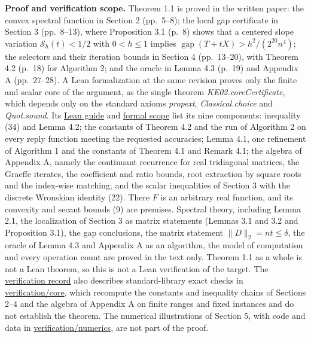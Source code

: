 \documentclass[11pt,a4paper]{article}
\begin{document}
\textbf{Proof and verification scope.} Theorem 1.1 is proved in the
written paper: the convex spectral function in Section 2 (pp.~5--8); the
local gap certificate in Section 3 (pp.~8--13), where Proposition 3.1
(p.~8) shows that a centered slope variation \(\mathcal S_h(t)<1/2\)
with \(0< h\leq1\) implies
\(\mathop{\mathrm{gap}}\nolimits(T+tX)>h^2/(2^{20}n^4)\); the selectors
and their iteration bounds in Section 4 (pp.~13--20), with Theorem 4.2
(p.~18) for Algorithm 2; and the oracle in Lemma 4.3 (p.~19) and
Appendix A (pp.~27--28). A Lean formalization at the same revision
proves only the finite and scalar core of the argument, as the single
theorem \textit{KE02.coreCertificate}, which depends only on the
standard axioms \textit{propext}, \textit{Classical.choice} and
\textit{Quot.sound}. Its
\href{https://github.com/erenup/tridiagonal-spectral-separation/blob/660debbcdb3bb81a1965e2c1ade82db80889abb7/lean/README.md}{Lean
guide} and
\href{https://github.com/erenup/tridiagonal-spectral-separation/blob/660debbcdb3bb81a1965e2c1ade82db80889abb7/lean/SCOPE.md}{formal
scope} list its nine components: inequality (34) and Lemma 4.2; the
constants of Theorem 4.2 and the run of Algorithm 2 on every reply
function meeting the requested accuracies; Lemma 4.1, one refinement of
Algorithm 1 and the constants of Theorem 4.1 and Remark 4.1; the algebra
of Appendix A, namely the continuant recurrence for real tridiagonal
matrices, the Graeffe iterates, the coefficient and ratio bounds, root
extraction by square roots and the index-wise matching; and the scalar
inequalities of Section 3 with the discrete Wronskian identity (22).
There \(F\) is an arbitrary real function, and its convexity and secant
bounds (9) are premises. Spectral theory, including Lemma 2.1, the
localization of Section 3 as matrix statements (Lemmas 3.1 and 3.2 and
Proposition 3.1), the gap conclusions, the matrix statement
\(\|D\|_2=nt\leq\delta\), the oracle of Lemma 4.3 and Appendix A as an
algorithm, the model of computation and every operation count are proved
in the text only. Theorem 1.1 as a whole is not a Lean theorem, so this
is not a Lean verification of the target. The
\href{https://github.com/erenup/tridiagonal-spectral-separation/blob/660debbcdb3bb81a1965e2c1ade82db80889abb7/VERIFICATION.md}{verification
record} also describes standard-library exact checks in
\href{https://github.com/erenup/tridiagonal-spectral-separation/blob/660debbcdb3bb81a1965e2c1ade82db80889abb7/verification/core/README.md}{verification/core},
which recompute the constants and inequality chains of Sections 2--4 and
the algebra of Appendix A on finite ranges and fixed instances and do
not establish the theorem. The numerical illustrations of Section 5,
with code and data in
\href{https://github.com/erenup/tridiagonal-spectral-separation/blob/660debbcdb3bb81a1965e2c1ade82db80889abb7/verification/numerics/README.md}{verification/numerics},
are not part of the proof.
\end{document}
